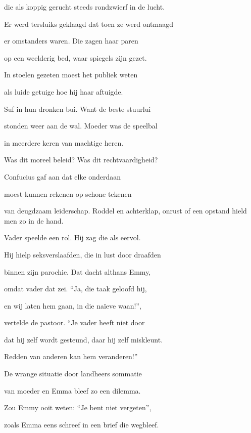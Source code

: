 die als koppig gerucht
steeds rondzwierf in de lucht.

Er werd tersluiks geklaagd
dat toen ze werd ontmaagd

er omstanders waren.
Die zagen haar paren

op een weelderig bed,
waar spiegels zijn gezet.

In stoelen gezeten
moest het publiek weten

als luide getuige
hoe hij haar aftuigde.

Suf in hun dronken bui.
Want de beste stuurlui

stonden weer aan de wal.
Moeder was de speelbal

in meerdere keren
van machtige heren.

Was dit moreel beleid?
Was dit rechtvaardigheid?

Confucius gaf aan
dat elke onderdaan

moest kunnen rekenen
op schone tekenen

van deugdzaam leiderschap.
Roddel en achterklap,
onrust of een opstand
hield men zo in de hand.

Vader speelde een rol.
Hij zag die als eervol.

Hij hielp seksverslaafden,
die in lust door draafden

binnen zijn parochie.
Dat dacht althans Emmy,

omdat vader dat zei.
“Ja, die taak geloofd hij,

en wij laten hem gaan,
in die naïeve waan!”,

vertelde de pastoor.
“Je vader heeft niet door

dat hij zelf wordt gesteund,
daar hij zelf miskleunt.

Redden van anderen
kan hem veranderen!”

De wrange situatie
door landheers sommatie

van moeder en Emma
bleef zo een dilemma.

Zou Emmy ooit weten:
“Je bent niet vergeten”,

zoals Emma eens schreef
in een brief die wegbleef.
